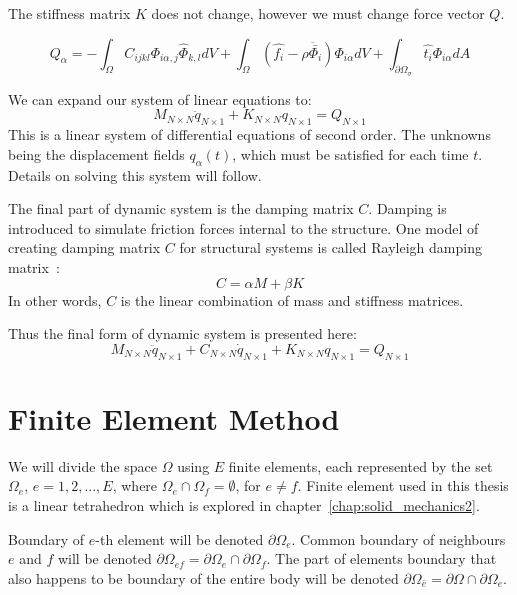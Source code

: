 \documentclass[en]{minipw} %
\begin{document}
The stiffness matrix $K$ does not change, however we must change force vector $Q$.

\begin{equation}
Q_{\alpha} = - \int_{\Omega} C_{ijkl} \Phi_{i \alpha,j} \hat{\Phi}_{k,l} dV + \int_{\Omega} (\hat{f_i} - \rho \ddot{\bar{\Phi_i}} ) \Phi_{i \alpha} dV + \int_{\partial \Omega_{\sigma}} \hat{t_i}\Phi_{i \alpha} dA
\end{equation}

We can expand our system of linear equations to:
\begin{equation}
\label{eq:fem_system}
M_{N \times N}\ddot{q}_{N \times 1} + K_{N \times N} q_{N \times 1} = Q_{N \times 1}
\end{equation}
This is a linear system of differential equations of second order. The unknowns being the displacement fields $q_{\alpha}(t)$, which must be satisfied for each time $t$. Details on solving this system will follow.

The final part of dynamic system is the damping matrix $C$. Damping is introduced to simulate friction forces internal to the structure. One model of creating damping matrix $C$ for structural systems is called Rayleigh damping matrix~\cite{damping}:
\begin{equation}
\label{eq:damping_matrix}
C = \alpha M + \beta K
\end{equation}
In other words, $C$ is the linear combination of mass and stiffness matrices.

Thus the final form of dynamic system is presented here:
\begin{equation}
\label{eq:fem_system_damping}
M_{N \times N}\ddot{q}_{N \times 1} + C_{N \times N}\dot{q}_{N \times 1} + K_{N \times N} q_{N \times 1} = Q_{N \times 1}
\end{equation}

\section{Finite Element Method}
We will divide the space $\Omega$ using $E$ finite elements, each represented by the set $\Omega_{e}$, $e = 1,2,...,E$, where $\Omega_{e} \cap \Omega_{f} = \emptyset$, for $e \neq f$. Finite element used in this thesis is a linear tetrahedron which is explored in chapter~\ref{chap:solid_mechanics2}.

Boundary of $e$-th element will be denoted $\partial \Omega_{e}$. Common boundary of neighbours $e$ and $f$ will be denoted $\partial \Omega_{ef} = \partial \Omega_e \cap \partial \Omega_f$. The part of elements boundary that also happens to be boundary of the entire body will be denoted $\partial \Omega_{\bar{e}} = \partial \Omega \cap \partial \Omega_{e}$.
\end{document}
